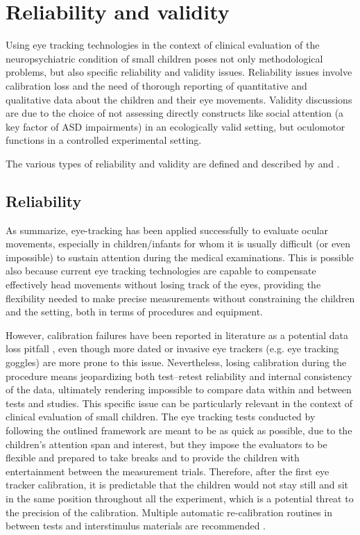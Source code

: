 \section{Reliability and validity}
\label{sec:fwkreliabilityvalidity}

Using eye tracking technologies in the context of clinical evaluation of the neuropsychiatric condition of small children poses not only methodological problems, but also specific reliability and validity issues. Reliability issues involve calibration loss and the need of thorough reporting of quantitative and qualitative data about the children and their eye movements. Validity discussions are due to the choice of not assessing directly constructs like social attention (a key factor of ASD impairments) in an ecologically valid setting, but oculomotor functions in a controlled experimental setting.

The various types of reliability and validity are defined and described by \citet[pp. 89-92]{leedy2012practicalresearch} and \cite{smyrnis2008guidelines}.



\subsection{Reliability}
\label{sec:fwkreliability}

As \cite{giordano2017eyetrackersystem} summarize, eye-tracking has been applied successfully to evaluate ocular movements, especially in children/infants for whom it is usually difficult (or even impossible) to sustain attention during the medical examinations. This is possible also because current eye tracking technologies are capable to compensate effectively head movements without losing track of the eyes, providing the flexibility needed to make precise measurements without constraining the children and the setting, both in terms of procedures and equipment.

However, calibration failures have been reported in literature as a potential data loss pitfall \citep{birmingham2017gazeselection}, even though more dated or invasive eye trackers (e.g. eye tracking goggles) are more prone to this issue. Nevertheless, losing calibration during the procedure means jeopardizing both test–retest reliability and internal consistency of the data, ultimately rendering impossible to compare data within and between tests and studies. This specific issue can be particularly relevant in the context of clinical evaluation of small children. The eye tracking tests conducted by following the outlined framework are meant to be as quick as possible, due to the children’s attention span and interest, but they impose the evaluators to be flexible and prepared to take breaks and to provide the children with entertainment between the measurement trials. Therefore, after the first eye tracker calibration, it is predictable that the children would not stay still and sit in the same position throughout all the experiment, which is a potential threat to the precision of the calibration. Multiple automatic re-calibration routines in between tests and interstimulus materials are recommended \citep{sasson2012children}.

